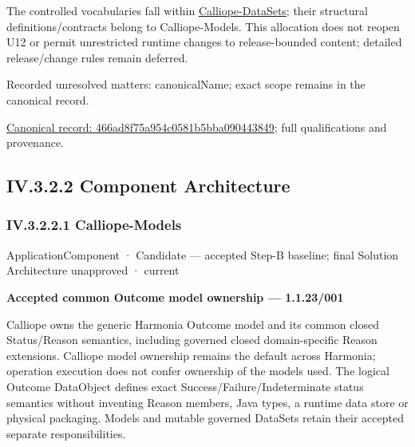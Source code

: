 The controlled vocabularies fall within \hyperref[element:466ad8f75a954c0581b5bba090443849]{Calliope-DataSets};
their structural definitions/contracts belong to Calliope-Models. This allocation
does not reopen U12 or permit unrestricted runtime changes to release-bounded
content; detailed release/change rules remain deferred.


{\small Recorded unresolved matters: canonicalName; exact scope remains in the canonical record.}\par
{\footnotesize \href{../../../../continuum/application/application-component/466ad8f75a954c0581b5bba090443849.md}{Canonical record: 466ad8f75a954c0581b5bba090443849}; full qualifications and provenance.}\par
\subsection*{IV.3.2.2 Component Architecture}
\label{navigation:IV.3.2.2}

\subsubsection*{IV.3.2.2.1 Calliope-Models}
\label{navigation:IV.3.2.2.1}

\label{element:307b3440a507403f8bc214d290bffb6a}
{\small ApplicationComponent · Candidate — accepted Step-B baseline; final Solution Architecture unapproved · current}\par

\par\medskip\textbf{Accepted common Outcome model ownership — 1.1.23/001}\par


Calliope owns the generic Harmonia Outcome model and its common closed Status/Reason semantics, including governed closed domain-specific Reason extensions. Calliope model ownership remains the default across Harmonia; operation execution does not confer ownership of the models used. The logical Outcome DataObject defines exact Success/Failure/Indeterminate status semantics without inventing Reason members, Java types, a runtime data store or physical packaging. Models and mutable governed DataSets retain their accepted separate responsibilities.



